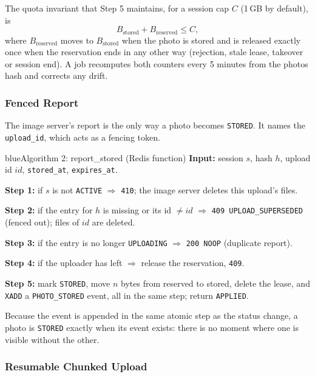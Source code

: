 The quota invariant that Step 5 maintains, for a session cap $C$ (1\,GB by default), is
\begin{equation}\label{eq:quota}
  B_\text{stored} + B_\text{reserved} \le C,
\end{equation}
where $B_\text{reserved}$ moves to $B_\text{stored}$ when the photo is stored and is released exactly once when the reservation ends in any other way (rejection, stale lease, takeover or session end). A job recomputes both counters every 5 minutes from the photos hash and corrects any drift.

\subsubsection{Fenced Report}

The image server's report is the only way a photo becomes \texttt{STORED}. It names the \texttt{upload\_id}, which acts as a fencing token.

\begin{pbox}{blue}{Algorithm 2: report\_stored (Redis function)}
\textbf{Input:} session $s$, hash $h$, upload id $id$, \texttt{stored\_at}, \texttt{expires\_at}.\par
\textbf{Step 1:} if $s$ is not \texttt{ACTIVE} $\Rightarrow$ \texttt{410}; the image server deletes this upload's files.\par
\textbf{Step 2:} if the entry for $h$ is missing or its id $\neq id$ $\Rightarrow$ \texttt{409 UPLOAD\_SUPERSEDED} (fenced out); files of $id$ are deleted.\par
\textbf{Step 3:} if the entry is no longer \texttt{UPLOADING} $\Rightarrow$ \texttt{200 NOOP} (duplicate report).\par
\textbf{Step 4:} if the uploader has left $\Rightarrow$ release the reservation, \texttt{409}.\par
\textbf{Step 5:} mark \texttt{STORED}, move $n$ bytes from reserved to stored, delete the lease, and \texttt{XADD} a \texttt{PHOTO\_STORED} event, all in the same step; return \texttt{APPLIED}.
\end{pbox}

Because the event is appended in the same atomic step as the status change, a photo is \texttt{STORED} exactly when its event exists: there is no moment where one is visible without the other.

\subsubsection{Resumable Chunked Upload}\label{sec:alg-upload}

